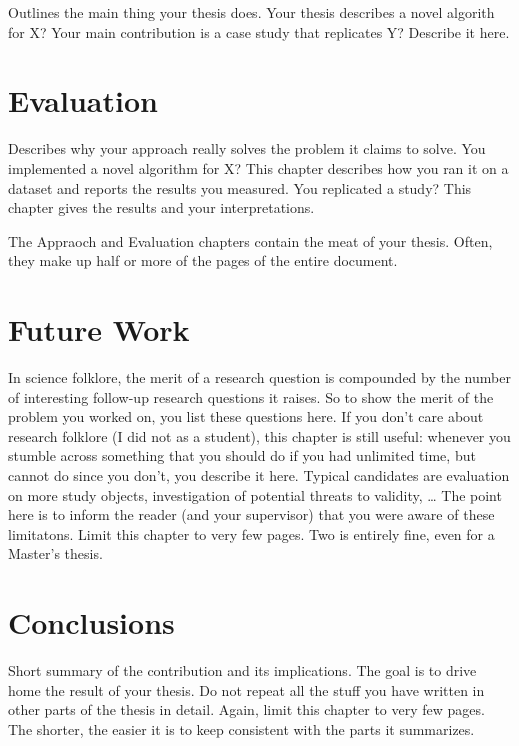 \documentclass[12pt]{article}
\begin{document}
Outlines the main thing your thesis does. Your thesis describes a novel algorith for X? Your main contribution is a case study that replicates Y? Describe it here.

\pagebreak

\section{Evaluation}
\label{sec:5}

Describes why your approach really solves the problem it claims to solve. You implemented a novel algorithm for X? 
This chapter describes how you ran it on a dataset and reports the results you measured. You replicated a study? This chapter gives the results and your interpretations.

The Appraoch and Evaluation chapters contain the meat of your thesis. Often, they make up half or more of the pages of the entire document.

\pagebreak

\section{Future Work}
\label{sec:6}

 In science folklore, the merit of a research question is compounded by the number of interesting follow-up research questions it raises. 
 So to show the merit of the problem you worked on, you list these questions here. If you don’t care about research folklore (I did not as a student),
 this chapter is still useful: whenever you stumble across something that you should do if you had unlimited time, but cannot do since you don’t, you describe it here. 
 Typical candidates are evaluation on more study objects, investigation of potential threats to validity, … 
 The point here is to inform the reader (and your supervisor) that you were aware of these limitatons. Limit this chapter to very few pages. 
 Two is entirely fine, even for a Master’s thesis.
\pagebreak


\section{Conclusions}
\label{sec:7}
Short summary of the contribution and its implications. The goal is to drive home the result of your thesis. Do not repeat all the stuff you have written in other parts of the thesis in detail. Again, limit this chapter to very few pages. 
The shorter, the easier it is to keep consistent with the parts it summarizes.
\end{document}
